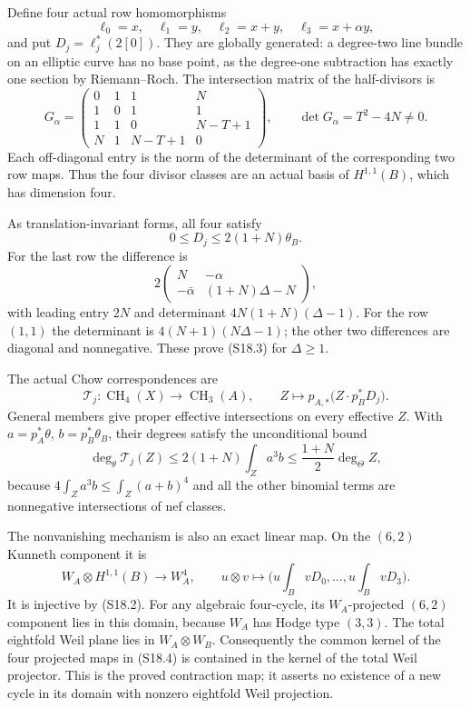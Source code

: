Define four actual row homomorphisms
\[
 \ell_0=x,\quad\ell_1=y,\quad\ell_2=x+y,
 \quad\ell_3=x+\alpha y,
\]
and put \(D_j=\ell_j^*(2[0])\). They are globally generated:
a degree-two line bundle on an elliptic curve has no base point,
as the degree-one subtraction has exactly one section by
Riemann--Roch. The intersection matrix of the half-divisors is
\[
 G_\alpha=
 \begin{pmatrix}
 0&1&1&N\\
 1&0&1&1\\
 1&1&0&N-T+1\\
 N&1&N-T+1&0
 \end{pmatrix},\qquad
 \det G_\alpha=T^2-4N\ne0.                               \tag{S18.2}
\]
Each off-diagonal entry is the norm of the determinant of the
corresponding two row maps. Thus the four divisor classes are an
actual basis of \(H^{1,1}(B)\), which has dimension four.

As translation-invariant forms, all four satisfy
\[
 0\le D_j\le 2(1+N)\theta_B.                             \tag{S18.3}
\]
For the last row the difference is
\[
 2\begin{pmatrix}N&-\alpha\\-\bar\alpha&(1+N)\Delta-N\end{pmatrix},
\]
with leading entry \(2N\) and determinant
\(4N(1+N)(\Delta-1)\). For the row \((1,1)\) the determinant
is \(4(N+1)(N\Delta-1)\); the other two differences are
diagonal and nonnegative. These prove (S18.3) for \(\Delta\ge1\).

The actual Chow correspondences are
\[
 \mathcal T_j:\operatorname{CH}_4(X)\longrightarrow
 \operatorname{CH}_3(A),\qquad
 Z\longmapsto p_{A,*}\bigl(Z\cdot p_B^*D_j\bigr).        \tag{S18.4}
\]
General members give proper effective intersections on every
effective \(Z\). With \(a=p_A^*\theta\), \(b=p_B^*\theta_B\),
their degrees satisfy the unconditional bound
\[
 \deg_\theta\mathcal T_j(Z)
 \le2(1+N)\int_Za^3b
 \le\frac{1+N}{2}\deg_\Theta Z,                         \tag{S18.5}
\]
because \(4\int_Za^3b\le\int_Z(a+b)^4\) and all the other
binomial terms are nonnegative intersections of nef classes.

The nonvanishing mechanism is also an exact linear map. On the
\((6,2)\) Kunneth component it is
\[
 W_A\otimes H^{1,1}(B)\longrightarrow W_A^4,
 \qquad u\otimes v\longmapsto
 \bigl(u\!\int_BvD_0,\ldots,u\!\int_BvD_3\bigr).       \tag{S18.6}
\]
It is injective by (S18.2). For any algebraic four-cycle, its
\(W_A\)-projected \((6,2)\) component lies in this domain,
because \(W_A\) has Hodge type \((3,3)\). The total eightfold
Weil plane lies in \(W_A\otimes W_B\). Consequently the common
kernel of the four projected maps in (S18.4) is contained in
the kernel of the total Weil projector. This is the proved
contraction map; it asserts no existence of a new cycle in its
domain with nonzero eightfold Weil projection.

